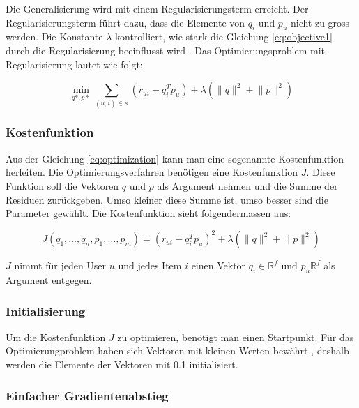 \documentclass[a4paper, 12pt]{article}
\begin{document}
 Die Generalisierung wird mit einem Regularisierungsterm erreicht. Der Regularisierungsterm führt dazu, dass die Elemente von $q_i$ und $p_u$ nicht zu gross werden. Die Konstante $\lambda$ kontrolliert, wie stark die Gleichung \ref{eq:objective1} durch die Regularisierung beeinflusst wird \cite{koren2009}. Das Optimierungsproblem mit Regularisierung lautet wie folgt:

\begin{equation}
  \label{eq:optimization}
      \min_{q*,p*} \sum_{(u,i) \in \kappa} (r_{ui} - q_i^T p_u) + \lambda (\lVert q \rVert^2 + \lVert p \lVert ^2)
\end{equation}

\subsubsection{Kostenfunktion}
\label{sec:opt}

Aus der Gleichung \ref{eq:optimization} kann man eine sogenannte Kostenfunktion herleiten. Die Optimierungsverfahren benötigen eine Kostenfunktion $J$. Diese Funktion soll die Vektoren $q$ und $p$ als Argument nehmen und die Summe der Residuen zurückgeben. Umso kleiner diese Summe ist, umso besser sind die Parameter gewählt. Die Kostenfunktion sieht folgendermassen aus:

\begin{equation}
  \label{eq:costfunction}
  J(q_1, \dots , q_n, p_1, \dots, p_m) =  (r_{ui} - q_i^T p_u)^2 + \lambda (\lVert q \rVert^2 + \lVert p \lVert ^2)
\end{equation}

$J$ nimmt für jeden User $u$ und jedes Item $i$ einen Vektor $q_i \in \mathbb{R}^f$ und $p_u \mathbb{R}^f$ als Argument entgegen.

\subsubsection{Initialisierung}
\label{sec:init}

Um die Kostenfunktion $J$ zu optimieren, benötigt man einen Startpunkt. Für das Optimierungproblem \label{eq:objective} haben sich Vektoren mit kleinen Werten bewährt \cite{Takacs08}, deshalb werden die Elemente der Vektoren mit 0.1 initialisiert. 

\subsubsection{Einfacher Gradientenabstieg}
\label{sec:gradientdescent}
 
\end{document}
